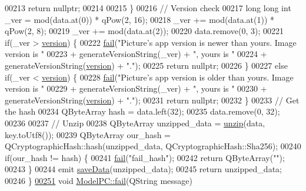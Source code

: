\begin{DoxyCode}
00213         \textcolor{keywordflow}{return} \textcolor{keyword}{nullptr};
00214 
00215     \}
00216     \textcolor{comment}{// Version check}
00217     \textcolor{keywordtype}{long} \textcolor{keywordtype}{long} \textcolor{keywordtype}{int} \_ver = mod(data.at(0)) * qPow(2, 16);
00218     \_ver += mod(data.at(1)) * qPow(2, 8);
00219     \_ver += mod(data.at(2));
00220     data.remove(0, 3);
00221     \textcolor{keywordflow}{if}(\_ver > \hyperlink{class_model_p_c_a5af48ab89e19be42a94c34ba00249401}{version}) \{
00222         \hyperlink{class_model_p_c_a47464b59b7e37fcee25e55475708aabd}{fail}(\textcolor{stringliteral}{"Picture's app version is newer than yours. Image version is "}
00223               + generateVersionString(\_ver) + \textcolor{stringliteral}{", yours is "}
00224               + generateVersionString(\hyperlink{class_model_p_c_a5af48ab89e19be42a94c34ba00249401}{version}) + \textcolor{stringliteral}{"."});
00225         \textcolor{keywordflow}{return} \textcolor{keyword}{nullptr};
00226     \}
00227     \textcolor{keywordflow}{else} \textcolor{keywordflow}{if}(\_ver < \hyperlink{class_model_p_c_a5af48ab89e19be42a94c34ba00249401}{version}) \{
00228         \hyperlink{class_model_p_c_a47464b59b7e37fcee25e55475708aabd}{fail}(\textcolor{stringliteral}{"Picture's app version is older than yours. Image version is "}
00229               + generateVersionString(\_ver) + \textcolor{stringliteral}{", yours is "}
00230               + generateVersionString(\hyperlink{class_model_p_c_a5af48ab89e19be42a94c34ba00249401}{version}) + \textcolor{stringliteral}{"."});
00231         \textcolor{keywordflow}{return} \textcolor{keyword}{nullptr};
00232     \}
00233     \textcolor{comment}{// Get the hash}
00234     QByteArray hash = data.left(32);
00235     data.remove(0, 32);
00236 
00237     \textcolor{comment}{// Unzip}
00238     QByteArray unzipped\_data = \hyperlink{class_model_p_c_a6da88f166785a49f73b22c169f956fd0}{unzip}(data, key.toUtf8());
00239     QByteArray our\_hash = QCryptographicHash::hash(unzipped\_data, QCryptographicHash::Sha256);
00240     \textcolor{keywordflow}{if}(our\_hash != hash) \{
00241         \hyperlink{class_model_p_c_a47464b59b7e37fcee25e55475708aabd}{fail}(\textcolor{stringliteral}{"fail\_hash"});
00242         \textcolor{keywordflow}{return} QByteArray(\textcolor{stringliteral}{""});
00243     \}
00244     emit \hyperlink{class_model_p_c_a0855107fb0ccc247cd9e893fae9bb08a}{saveData}(unzipped\_data);
00245     \textcolor{keywordflow}{return} unzipped\_data;
00246 \}
\hypertarget{modelpc_8cpp_source_l00251}{}\hyperlink{class_model_p_c_a47464b59b7e37fcee25e55475708aabd}{00251} \textcolor{keywordtype}{void} \hyperlink{class_model_p_c_a47464b59b7e37fcee25e55475708aabd}{ModelPC::fail}(QString message)

\end{DoxyCode}
